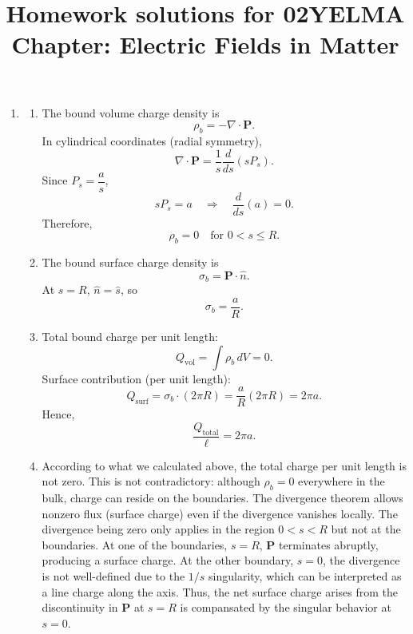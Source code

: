 \documentclass[12pt]{article}
\title{Homework solutions for 02YELMA \\ Chapter: Electric Fields in Matter}
\begin{document}
\date{}
\maketitle
\vspace{-0.8in}

\begin{enumerate}

\item 

\begin{enumerate}
    \item The bound volume charge density is
    \[
    \rho_b = -\nabla \cdot \mathbf{P}.
    \]
    In cylindrical coordinates (radial symmetry),
    \[
    \nabla \cdot \mathbf{P} = \frac{1}{s}\frac{d}{ds}(s P_s).
    \]
    Since $P_s = \dfrac{a}{s}$,
    \[
    sP_s = a \quad \Rightarrow \quad \frac{d}{ds}(a) = 0.
    \]
    Therefore,
    \[
    \boxed{\rho_b = 0 \quad \text{for } 0<s\le R.}
    \]

    \item The bound surface charge density is
    \[
    \sigma_b = \mathbf{P} \cdot \hat{n}.
    \]
    At $s=R$, $\hat{n} = \hat{s}$, so
    \[
    \boxed{\sigma_b = \frac{a}{R}.}
    \]

    \item Total bound charge per unit length:
    \[
    Q_{\text{vol}} = \int \rho_b\, dV = 0.
    \]
    Surface contribution (per unit length):
    \[
    Q_{\text{surf}} = \sigma_b \cdot (2\pi R) = \frac{a}{R}(2\pi R) = 2\pi a.
    \]
    Hence,
    \[
    \boxed{\frac{Q_{\text{total}}}{\ell} = 2\pi a.}
    \]

    \item According to what we calculated above, the total charge per unit length is not zero. This is not contradictory: although $\rho_b=0$ everywhere in the bulk, charge can reside on the boundaries. The divergence theorem allows nonzero flux (surface charge) even if the divergence vanishes locally. The divergence being zero only applies in the region $0<s<R$ but not at the boundaries. At one of the boundaries, $s=R$, $\mathbf{P}$ terminates abruptly, producing a surface charge. At the other boundary, $s=0$, the divergence is not well-defined due to the $1/s$ singularity, which can be interpreted as a line charge along the axis. Thus, the net surface charge arises from the discontinuity in $\mathbf{P}$ at $s=R$ is compansated by the singular behavior at $s=0$.
\end{enumerate}




\end{enumerate}
\end{document}
